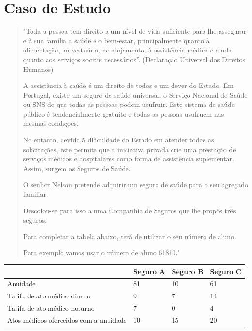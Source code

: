 \documentclass[10pt,a4paper]{article}
\begin{document}
\section{Caso de Estudo}
\begin{quote}
"Toda a pessoa tem direito a um nível de vida suficiente para lhe assegurar e à sua família a saúde e o bem-estar, principalmente quanto à alimentação, ao vestuário, ao alojamento, à assistência médica e ainda quanto aos serviços sociais necessários”. (Declaração Universal dos Direitos Humanos)

A assistência à saúde é um direito de todos e um dever do Estado. Em Portugal, existe um seguro de saúde universal, o Serviço Nacional de Saúde ou SNS de que todas as pessoas podem usufruir. Este sistema de saúde público é tendencialmente gratuito e todas as pessoas usufruem nas mesmas condições.

No entanto, devido à dificuldade do Estado em atender todas as solicitações, este permite que a iniciativa privada crie uma prestação de serviços médicos e hospitalares como forma de assistência suplementar. Assim, surgem os Seguros de Saúde.

O senhor Nelson pretende adquirir um seguro de saúde para o seu agregado familiar.

Descolou-se para isso a uma Companhia de Seguros que lhe propôs três seguros.

Para completar a tabela abaixo, terá de utilizar o seu número de aluno.

Para exemplo vamos usar o número de aluno 61810."
\end{quote}



\begin{table}[!ht]
    \centering
    \begin{tabular}{|l|l|l|l|}
    \hline
        ~ & Seguro A & Seguro B & Seguro C \\ \hline
        Anuidade & 81 & 10 & 61 \\ \hline
        Tarifa de ato médico diurno & 9 & 7 & 14\\ \hline
        Tarifa de ato médico noturno & 7 & 0 & 4  \\ \hline
        Atos médicos oferecidos com a anuidade & 10 & 15 & 20 \\ \hline

    \end{tabular}
	
\end{table}
\end{document}
